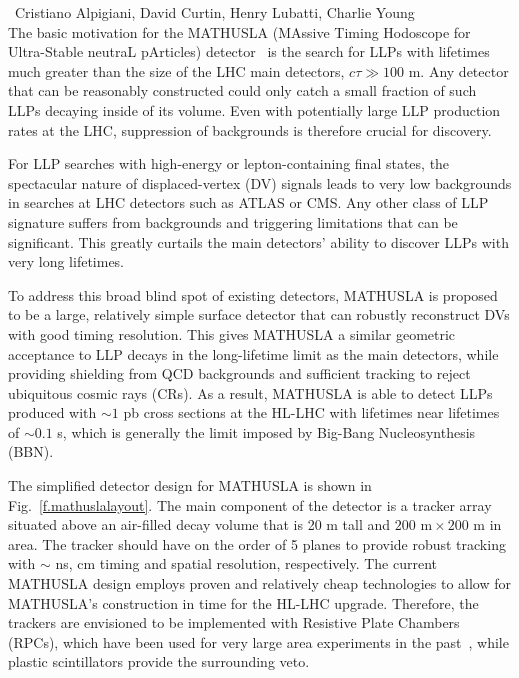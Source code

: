 ~Cristiano Alpigiani, David Curtin, Henry Lubatti, Charlie Young \\

The basic motivation for the MATHUSLA (MAssive Timing Hodoscope for Ultra-Stable neutraL pArticles) detector~\cite{Chou:2016lxi} is the search for LLPs with lifetimes much greater than the size of the LHC main detectors, $c \tau \gg 100$ m.
%
Any detector that can be reasonably constructed could only catch a small fraction of such LLPs decaying inside of its volume.
%
Even with potentially large LLP production rates at the LHC, suppression of backgrounds is  therefore crucial for discovery. 

For LLP searches with high-energy or lepton-containing final states, the spectacular  nature of displaced-vertex (DV) signals leads to very low backgrounds in searches at LHC detectors such as ATLAS or CMS.
%
Any other class of LLP signature suffers from backgrounds and triggering limitations that can be  significant. This greatly curtails the main detectors' ability to discover LLPs with very long lifetimes. 

To address this broad blind spot of existing detectors, 
MATHUSLA is proposed to be a large, relatively simple surface detector that can robustly reconstruct DVs with good timing resolution. 
%
This gives MATHUSLA a similar geometric acceptance to LLP decays in the long-lifetime limit as the main detectors, while providing shielding from QCD backgrounds and sufficient tracking to reject ubiquitous cosmic rays (CRs). 
%
As a result, MATHUSLA is able to detect LLPs produced with $\sim1$ pb cross sections at the HL-LHC with lifetimes near lifetimes of $\sim 0.1$ s, which is generally the limit imposed by Big-Bang Nucleosynthesis (BBN).


The simplified detector design for MATHUSLA is shown in Fig.~\ref{f.mathuslalayout}.
%
The main component of the detector is a tracker array situated above an air-filled decay volume that is 20 m tall and $200\,\,\mathrm{m} \times 200\,\,\mathrm{m}$ in area. The tracker should have on the order of 5 planes to provide robust tracking with $\sim$ ns, cm timing and spatial resolution, respectively.
%
The current MATHUSLA design employs proven and relatively cheap technologies to allow for MATHUSLA's construction in time for the HL-LHC upgrade. Therefore, the trackers are envisioned to be implemented with Resistive Plate Chambers (RPCs), which have been used for very large area experiments in the past~\cite{Aielli:2006cj, Iuppa:2015hna}, while plastic scintillators provide the surrounding veto.  


